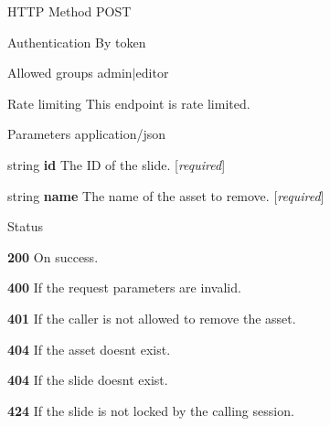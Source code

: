 \begin{DoxyParagraph}{H\+T\+TP Method}
P\+O\+ST 
\end{DoxyParagraph}
\begin{DoxyParagraph}{Authentication}
By token 
\end{DoxyParagraph}
\begin{DoxyParagraph}{Allowed groups}
{\ttfamily admin$\vert$editor} 
\end{DoxyParagraph}
\begin{DoxyParagraph}{Rate limiting}
This endpoint is rate limited.
\end{DoxyParagraph}
\begin{DoxyParagraph}{Parameters}
application/json
\begin{DoxyItemize}
\item {\ttfamily string} {\bfseries id} The ID of the slide. \mbox{[}{\itshape required}\mbox{]}
\item {\ttfamily string} {\bfseries name} The name of the asset to remove. \mbox{[}{\itshape required}\mbox{]}
\end{DoxyItemize}
\end{DoxyParagraph}
\begin{DoxyParagraph}{Status}

\begin{DoxyItemize}
\item {\bfseries 200} On success.
\item {\bfseries 400} If the request parameters are invalid.
\item {\bfseries 401} If the caller is not allowed to remove the asset.
\item {\bfseries 404} If the asset doesn\textquotesingle{}t exist.
\item {\bfseries 404} If the slide doesn\textquotesingle{}t exist.
\item {\bfseries 424} If the slide is not locked by the calling session. 
\end{DoxyItemize}
\end{DoxyParagraph}
